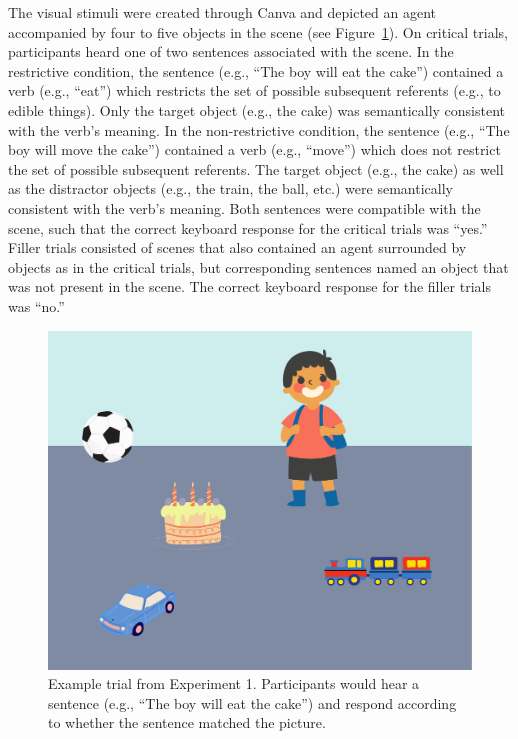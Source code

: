 \documentclass[
  man,floatsintext]{apa6}
\begin{document}
The visual stimuli were created through Canva and depicted an agent
accompanied by four to five objects in the scene (see Figure~\ref{fig:E1-example-trial}). On
critical trials, participants heard one of two sentences associated with
the scene. In the restrictive condition, the sentence (e.g., ``The boy
will eat the cake'') contained a verb (e.g., ``eat'') which restricts the
set of possible subsequent referents (e.g., to edible things). Only the
target object (e.g., the cake) was semantically consistent with the
verb's meaning. In the non-restrictive condition, the sentence (e.g.,
``The boy will move the cake'') contained a verb (e.g., ``move'') which does
not restrict the set of possible subsequent referents. The target object
(e.g., the cake) as well as the distractor objects (e.g., the train, the
ball, etc.) were semantically consistent with the verb's meaning. Both
sentences were compatible with the scene, such that the correct keyboard
response for the critical trials was ``yes.'' Filler trials consisted of
scenes that also contained an agent surrounded by objects as in the critical trials, but corresponding sentences named an object that was not present in the scene. The correct keyboard response for the filler
trials was ``no.''

\begin{figure}
\centering
\includegraphics{group-a/E1-example-trial.jpeg}
\caption{\label{fig:E1-example-trial}Example trial from Experiment 1. Participants would hear a sentence (e.g., ``The boy will eat the cake'') and respond according to whether the sentence matched the picture.}
\end{figure}
\end{document}
